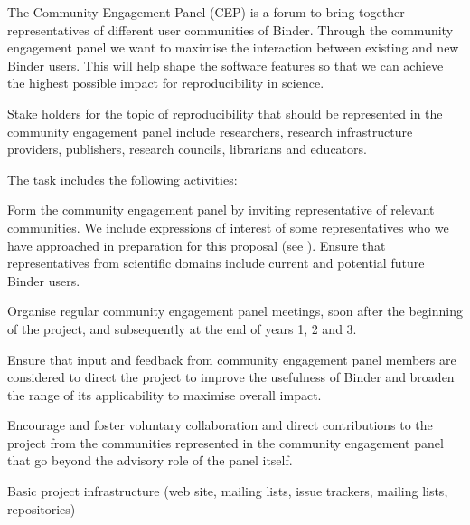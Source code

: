 \begin{workpackage}[id=management,type=MGT,wphases=0-36!.44,
  title=Project Management,
  short=Management,
  lead=SRL,
  MPRM=1,
  QSRM=1,
  IFRRM=1,
  UIORM=1,
  SRLRM=12,
  swsites
]
\begin{tasklist}
\begin{task}[
  title=Community Engagement Panel,
  id=community-engagement-panel,
  lead=SRL,
  PM=4,
  wphases={0-36!.111},
  partners={MP,QS,UIO,IFR},
  ]
  The Community Engagement Panel (CEP) is a forum to bring together
  representatives of different user communities of Binder. Through the community
  engagement panel we want to maximise the interaction between existing and new
  Binder users. This will help shape the software features so that we can
  achieve the highest possible impact for reproducibility in science.

  Stake holders for the topic of reproducibility that should be represented in the
  community engagement panel include researchers, research infrastructure
  providers, publishers, research councils, librarians and educators.

The task includes the following activities:
\begin{compactenum}
\item Form the community engagement panel by inviting representative of relevant
  communities. We include expressions of interest of some representatives who we
  have approached in preparation for this proposal (see ). Ensure that
  representatives from scientific domains include current and potential future
  Binder users.
\item Organise regular community engagement panel meetings, soon after the
  beginning of the project, and subsequently at the end of years 1, 2 and 3.
\item Ensure that input and feedback from community engagement panel members are
  considered to direct the project to improve the usefulness of Binder
  and broaden the range of its applicability to maximise overall impact.
\item Encourage and foster voluntary collaboration and direct contributions to
  the project from the communities represented in the community engagement
  panel that go beyond the advisory role of the panel itself.
\end{compactenum}
\end{task}
\end{tasklist}


\begin{wpdelivs}

\begin{wpdeliv}[due=2,miles=startup,id=infrastructure,dissem=PU,nature=DEC,lead=SRL]
  {Basic project infrastructure (web site, mailing lists, issue trackers, mailing lists, repositories)}
\end{wpdeliv}


\end{wpdelivs}
\end{workpackage}
